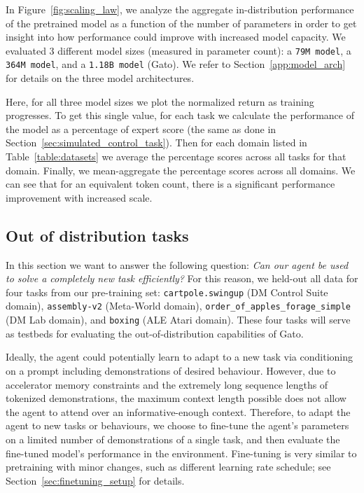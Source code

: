 \documentclass[10pt]{article} \usepackage[accepted]{tmlr}
\newcommand{\model}{{Gato}}
\newcommand{\dmlab}{{DM Lab}}
\newcommand{\atari}{{ALE Atari}}
\newcommand{\dmcontrol}{{DM Control Suite}}
\newcommand{\metaworld}{{Meta-World}}
\begin{document}
In Figure~\ref{fig:scaling_law}, we analyze the aggregate in-distribution performance of the pretrained model as a function of the number of parameters in order to get insight into how performance could improve with increased model capacity.
We evaluated 3 different model sizes (measured in  parameter count):
a \texttt{79M model}, 
a \texttt{364M model},
and a \texttt{1.18B model} (\model{}). 
We refer to Section~\ref{app:model_arch} for details on the three model architectures.

Here, for all three model sizes we plot the normalized return as training progresses.
To get this single value, for each task we calculate the performance of the model as a percentage of expert score (the same as done in Section~\ref{sec:simulated_control_task}).
Then for each domain listed in Table~\ref{table:datasets} we average the percentage scores across all tasks for that domain.
Finally, we mean-aggregate the percentage scores across all domains.
We can see that for an equivalent token count, there is a significant performance improvement with increased scale.
\vskip 0.4cm
\subsection{Out of distribution tasks}\label{sec:ood_results}
\vskip 0.2cm
In this section we want to answer the following question: \emph{Can our agent be used to solve a completely new task efficiently?}
For this reason, we held-out all data for four tasks from our pre-training set: \texttt{cartpole.swingup} (\dmcontrol{} domain), \texttt{assembly-v2} (\metaworld{} domain), \texttt{order\_of\_apples\_forage\_simple} (\dmlab{} domain), and \texttt{boxing} (\atari{} domain).
These four tasks will serve as testbeds for evaluating the out-of-distribution capabilities of \model{}.


Ideally, the agent could potentially learn to adapt to a new task via conditioning on a prompt including demonstrations of desired behaviour. 
However, due to accelerator memory constraints and the extremely long sequence lengths of tokenized demonstrations, the  maximum context length possible does not allow the agent to attend over an informative-enough context. 
Therefore, to adapt the agent to new tasks or behaviours, we choose to fine-tune the agent's parameters on a limited number of demonstrations of a single task, and then evaluate the fine-tuned model's performance in the environment.
Fine-tuning is very similar to pretraining with minor changes, such as different learning rate schedule; see Section~\ref{sec:finetuning_setup} for details.
\end{document}
